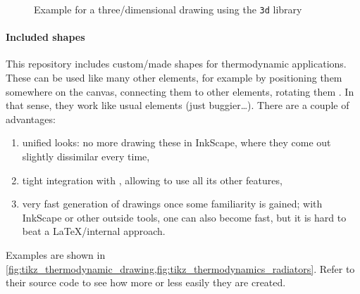\begin{figure}[tbp]
    \caption{%
        Example for a three\-/dimensional  drawing using the
        \texttt{3d} library%
    }
    \label{fig:tikz_threedimensional_example}
\end{figure}

\paragraph{Included shapes}
This repository includes custom\-/made shapes for thermodynamic applications.
These can be used like many other  elements, for example by
positioning them somewhere on the canvas, connecting them to other elements,
rotating them .
In that sense, they work like usual  elements (just buggier\dots{}).
There are a couple of advantages:
\begin{enumerate}
    \item unified looks: no more drawing these in InkScape, where they come out
          slightly dissimilar every time,
    \item tight integration with , allowing to use all its other
          features,
    \item very fast generation of drawings once some familiarity is gained;
          with InkScape or other outside tools, one can also become fast, but it is
          hard to beat a \LaTeX{}\-/internal approach.
\end{enumerate}
Examples are shown in
\cref{fig:tikz_thermodynamic_drawing,fig:tikz_thermodynamics_radiators}.
Refer to their source code to see how more or less easily they are created.

